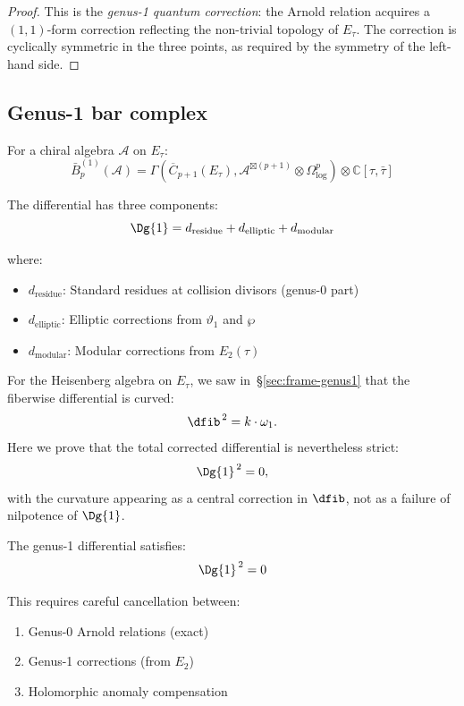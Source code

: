 \begin{proof}
This is the \emph{genus-1 quantum correction}: the Arnold relation acquires a $(1,1)$-form correction reflecting the non-trivial topology of $E_\tau$.  The correction is cyclically symmetric in the three points, as required by the symmetry of the left-hand side.
\end{proof}

\subsection{Genus-1 bar complex}

\begin{definition}
\label{def:genus1-bar-complex}
For a chiral algebra $\mathcal{A}$ on $E_\tau$:
\begin{equation}
\bar{B}^{(1)}_p(\mathcal{A}) = \Gamma\left(\overline{C}_{p+1}(E_\tau), 
\mathcal{A}^{\boxtimes (p+1)} \otimes \Omega^p_{\log}\right) \otimes \mathbb{C}[\tau, \bar{\tau}]
\end{equation}

The differential has three components:
\begin{equation}
\Dg{1} = d_{\text{residue}} + d_{\text{elliptic}} + d_{\text{modular}}
\end{equation}

where:
\begin{itemize}
\item $d_{\text{residue}}$: Standard residues at collision divisors (genus-0 part)
\item $d_{\text{elliptic}}$: Elliptic corrections from $\vartheta_1$ and $\wp$
\item $d_{\text{modular}}$: Modular corrections from $E_2(\tau)$
\end{itemize}
\end{definition}

\begin{theorem}
\label{thm:genus1-d-squared}
For the Heisenberg algebra on $E_\tau$, we saw in~\S\ref{sec:frame-genus1} that the
fiberwise differential is curved:
\[
\dfib^{\,2} = k \cdot \omega_1.
\]
Here we prove that the total corrected differential is nevertheless strict:
\[
\Dg{1}^{\,2} = 0,
\]
with the curvature appearing as a central correction in $\dfib$, not as a failure
of nilpotence of $\Dg{1}$.

The genus-1 differential satisfies:
\begin{equation}
\Dg{1}^{\,2} = 0
\end{equation}

This requires careful cancellation between:
\begin{enumerate}
\item Genus-0 Arnold relations (exact)
\item Genus-1 corrections (from $E_2$)
\item Holomorphic anomaly compensation
\end{enumerate}
\end{theorem}

